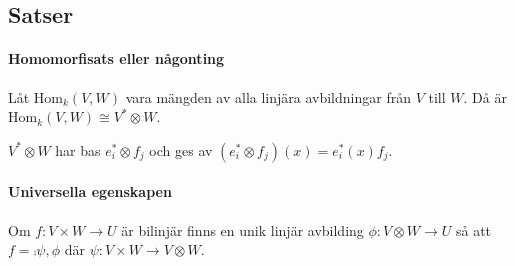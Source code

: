 \subsection{Satser}

\paragraph{Homomorfisats eller någonting}
Låt $\text{Hom}_{k}(V, W)$ vara mängden av alla linjära avbildningar från $V$ till $W$. Då är $\text{Hom}_{k}(V, W)\cong V^{*}\otimes W$.

\proof
$V^{*}\otimes W$ har bas $e_{i}^{*}\otimes f_{j}$ och ges av $(e_{i}^{*}\otimes f_{j})(x) = e_{i}^{*}(x) f_{j}$.

\paragraph{Universella egenskapen}
Om $f: V\times W\to U$ är bilinjär finns en unik linjär avbilding $\phi: V\otimes W\to U$ så att $f = \comp{{\psi, \phi}}$ där $\psi: V\times W\to V\otimes W$.

\proof
